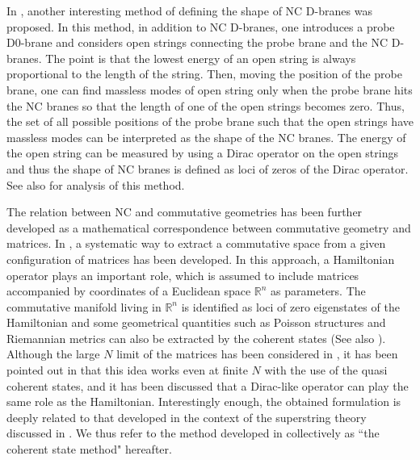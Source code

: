 \documentclass[12pt]{article}
\numberwithin{equation}{section}
\def\real{\mathbb{R}}
\begin{document}
In \cite{Berenstein2012}, 
another interesting method of defining the shape of NC 
D-branes was proposed. In this method, in addition to NC D-branes, 
one introduces a probe D0-brane and considers open strings 
connecting the probe brane and the NC D-branes. 
The point is that the lowest energy of an open string is 
always proportional to the length of the string. 
Then, moving the position of the probe brane, 
one can find massless modes of open string only when the probe brane hits the 
NC branes so that the length of one of the open strings becomes zero.
Thus, the set of all possible positions of the probe brane such that
the open strings have massless modes can be interpreted as 
the shape of the NC branes. 
The energy of the open string can be measured by using 
a Dirac operator on the open strings and thus the shape of NC branes 
is defined as loci of zeros of the Dirac operator.
See also \cite{DeBadyn2015,Karczmarek2015} for analysis of this method.


The relation between NC and commutative geometries has been further developed 
as a mathematical correspondence between commutative geometry and matrices. 
In {\cite{Ishiki2015}}, a systematic way to extract a commutative space 
from a given configuration of matrices has been developed. 
In this approach, a Hamiltonian operator plays an important role, 
which is assumed to include matrices accompanied 
by coordinates of a Euclidean space $\real^n$ as parameters. 
The commutative manifold living in $\real^n$ is identified as 
loci of zero eigenstates of the Hamiltonian
and some geometrical quantities such as Poisson structures and Riemannian metrics 
can also be extracted by the coherent {states} \cite{Ishiki2015}
(See also \cite{Ishiki2016}). 
Although the large $N$ limit of the matrices has been considered in {\cite{Ishiki2015}}, 
it has been pointed out in \cite{Schneiderbauer2016} that this idea works even 
at finite $N$ with the use of the quasi coherent states, 
and it has been discussed that a Dirac-like operator 
can play the same role as the Hamiltonian.  
Interestingly enough, the obtained formulation is deeply related 
to that developed in the context of 
the superstring theory discussed in \cite{Berenstein2012}.  
We thus refer to the method developed in 
\cite{Berenstein2012,Ishiki2015,Schneiderbauer2016}
collectively as ``the coherent state method" hereafter. 
\end{document}
